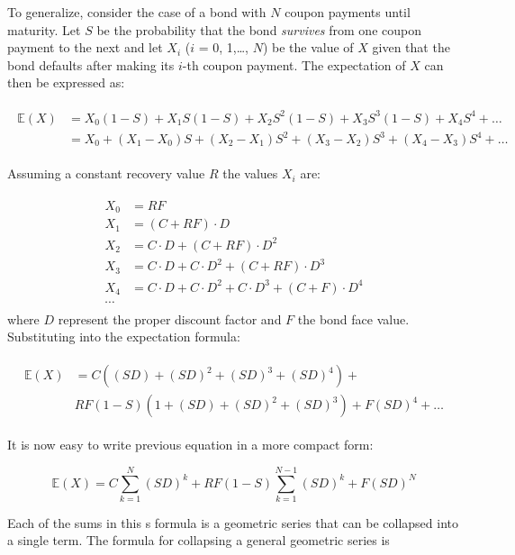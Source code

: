 \begin{attention}
To generalize, consider the case of a bond with $N$ coupon payments
until maturity. Let $S$ be the probability that the bond \emph{survives} 
from one coupon payment to the next and let $X_i$ ($i$ = 0, 1,\ldots, $N$) be the value of $X$ given that the bond defaults after making its $i$-th coupon payment. 
The expectation of $X$ can then be expressed as:

\begin{align}
\begin{split}
\mathbb{E}(X) &= X_0(1-S) + X_1 S(1-S) + X_2 S^2 (1-S) + X_3 S^3 (1-S) + X_4 S^4 + \ldots \\
&= X_0 + (X_1 - X_0)S + (X_2 - X_1)S^2 + (X_3 - X_2)S^3 + (X_4 - X_3)S^4 + \ldots
\end{split}
\end{align}

Assuming a constant recovery value $R$ the values $X_i$ are:

\begin{align}
\begin{split}
X_0 &= RF \\
X_1 &= (C + RF)\cdot D \\
X_2 &= C\cdot D + (C + RF)\cdot D^2 \\
X_3 &= C\cdot D + C\cdot D^2 + (C + RF)\cdot D^3 \\
X_4 &= C\cdot D + C\cdot D^2 + C\cdot D^3 + (C + F)\cdot D^4 \\
\cdots 
\end{split}
\end{align}
where $D$ represent the proper discount factor and $F$ the bond face value.
Substituting into the expectation formula:

\begin{align}
\begin{split}
\mathbb{E}(X) &= C((SD) + (SD)^2 + (SD)^3 + (SD)^4) + \\
&RF(1-S)(1+(SD)+(SD)^2 + (SD)^3) + F(SD)^4 + \ldots
\end{split}
\end{align}

It is now easy to write previous equation in a more compact form:

\begin{equation} 
\mathbb{E}(X) = C \sum_{k=1}^{N}{(SD)^k} + RF(1-S)\sum_{k=1}^{N-1}{(SD)^k} + F(SD)^N 
\end{equation}

Each of the sums in this s formula is a geometric series that can be collapsed
into a single term. The formula for collapsing a general geometric series is 


\end{attention}
